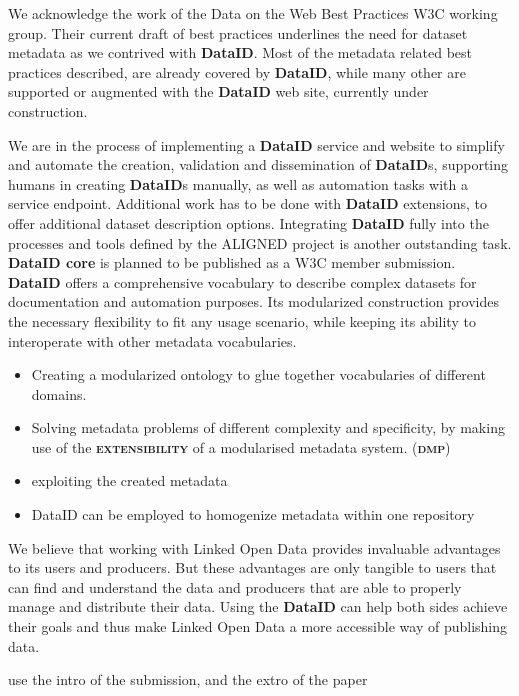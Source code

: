 \documentclass[a4paper,english,twoside,BCOR1.5cm,headsepline,DIV12,appendixprefix,final,12pt]{scrbook}
\newcommand{\extensibility}{{\ttfamily\scshape\bfseries extensibility}\xspace}
\newcommand{\dataid}{{\ttfamily\bfseries DataID}\xspace}
\newcommand{\core}{{\ttfamily\bfseries DataID core}\xspace}
\newcommand{\dmp}{{\scshape\bfseries dmp}\xspace}
\begin{document}
We acknowledge the work of the Data on the Web Best Practices W3C working group. Their current draft of best practices\cite{xyz} underlines the need for dataset metadata as we contrived with \dataid. Most of the metadata related best practices described, are already covered by \dataid, while many other are supported or augmented with the \dataid web site, currently under construction.

We are in the process of implementing a \dataid service and website to simplify and automate the creation, validation and dissemination of \dataid{}s, supporting humans in creating \dataid{}s manually, as well as automation tasks with a service endpoint. Additional work has to be done with \dataid extensions, to offer additional dataset description options. Integrating \dataid fully into the processes and tools defined by the ALIGNED project is another outstanding task. 
\core is planned to be published as a W3C member submission.
\dataid offers a comprehensive vocabulary to describe complex datasets for documentation and automation purposes. Its modularized construction provides the necessary flexibility to fit any usage scenario, while keeping its ability to interoperate with other metadata vocabularies.
\begin{itemize}
\item Creating a modularized ontology to glue together vocabularies of different domains.
\item Solving metadata problems of different complexity and specificity, by making use of the \extensibility of a modularised metadata system. (\dmp)
\item exploiting the created metadata
\item DataID can be employed to homogenize metadata within one repository 
\end{itemize}

We believe that working with Linked Open Data provides
invaluable advantages to its users and producers. But these
advantages are only tangible to users that can find and
understand the data and producers that are able to properly
manage and distribute their data. Using the \dataid can
help both sides achieve their goals and thus make Linked
Open Data a more accessible way of publishing data.

use the intro of the submission, and the extro of the paper

\end{document}
